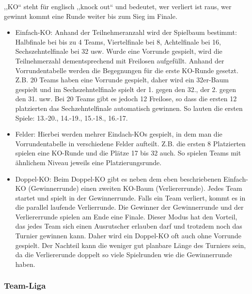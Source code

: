 ,,KO`` steht für englisch ,,knock out`` und bedeutet, wer verliert ist raus, wer gewinnt kommt eine Runde weiter bis zum Sieg im Finale. 


\begin{itemize}
\item Einfach-KO: Anhand der Teilnehmeranzahl wird der Spielbaum bestimmt: Halbfinale bei bis zu 4 Teams, Viertelfinale bei 8, Achtelfinale bei 16, Sechszehntelfinale bei 32 usw. 
Wurde eine Vorrunde gespielt, wird die Teilnehmerzahl dementsprechend mit Freilosen aufgefüllt. Anhand der Vorrundentabelle werden die Begegnungen für die erste KO-Runde gesetzt.
Z.B. 20 Teams haben eine Vorrunde gespielt, daher wird ein 32er-Baum gespielt und im Sechszehntelfinale spielt der 1. gegen den 32., der 2. gegen den 31. usw.
Bei 20 Teams gibt es jedoch 12 Freilose, so dass die ersten 12 platzierten das Sechzehntelfinale automatisch gewinnen. So lauten die ersten Spiele: 13.-20., 14.-19., 15.-18., 16.-17.  
\item Felder: Hierbei werden mehrer Eindach-KOs gespielt, in dem man die Vorrundentabelle in verschiedene Felder aufteilt. Z.B. die ersten 8 Platzierten spielen eine KO-Runde und die Plätze 17 bis 32 auch. 
So spielen Teams mit ähnlichem Niveau jeweils eine Platzierungsrunde. 
\item Doppel-KO: Beim Doppel-KO gibt es neben dem eben beschriebenen Einfach-KO (Gewinnerrunde) einen zweiten KO-Baum (Verliererrunde). Jedes Team startet und spielt in der Gewinnerrunde. Falls ein Team verliert, kommt es in die parallel laufende Verlierrunde. Die Gewinner der Gewinnerrunde und der Verliererrunde spielen am Ende eine Finale.
Dieser Modus hat den Vorteil, das jedes Team sich einen Ausrutscher erlauben darf und trotzdem noch das Turnier gewinnen kann. Daher wird ein Doppel-KO oft auch ohne Vorrunde gespielt.
Der Nachteil kann die weniger gut planbare Länge des Turniers sein, da die Verliererunde doppelt so viele Spielrunden wie die Gewinnerrunde haben.   
\end{itemize}


\subsubsection{Team-Liga}
\label{turniere:vorbereitung:modus:liga}

